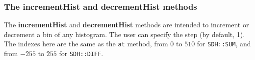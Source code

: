 \subsubsection{The incrementHist and decrementHist methods}
The \textbf{incrementHist} and \textbf{decrementHist} methods are
intended to increment or decrement a bin of any histogram. The user can specify
the step (by default, 1). The indexes here are the same as the \texttt{at}
method, from $0$ to $510$ for \texttt{SDH::SUM}, and from $-255$ to $255$
for \texttt{SDH::DIFF}.

